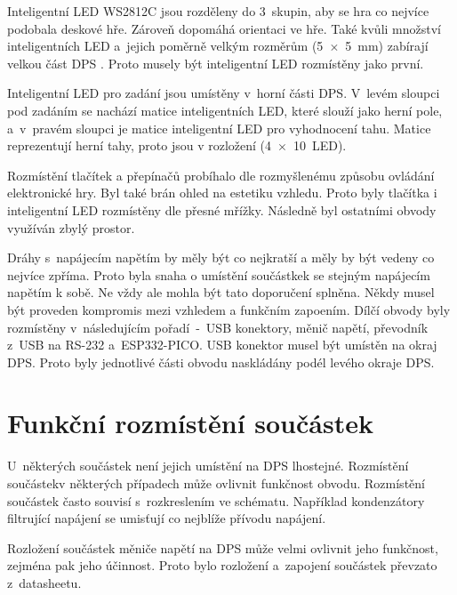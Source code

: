   Inteligentní LED WS2812C jsou rozděleny do 3~skupin, aby se hra co nejvíce podobala deskové hře. Zároveň dopomáhá orientaci ve hře.
  Také kvůli množství inteligentních LED a~jejich poměrně velkým rozměrům (5~$\times$~5~mm) zabírají velkou část DPS 
  \cite{WS2812C_datasheet}. Proto musely být inteligentní LED rozmístěny jako první.

  Inteligentní LED pro zadání jsou umístěny v~horní části DPS. V~levém sloupci pod zadáním se nachází matice inteligentních LED, které slouží jako herní 
  pole, a~v~pravém sloupci je matice inteligentní LED pro vyhodnocení tahu. Matice reprezentují herní tahy, proto jsou v rozložení (4~$\times$~10~LED).
  
  Rozmístění tlačítek a přepínačů probíhalo dle 
  rozmyšlenému způsobu ovládání elektronické hry. Byl také brán ohled na estetiku vzhledu. Proto byly tlačítka i inteligentní LED
  rozmístěny dle přesné mřížky. Následně byl ostatními obvody využíván zbylý prostor. 

  Dráhy s~napájecím napětím by měly být co nejkratší a měly by být vedeny co nejvíce zpříma. Proto byla snaha o umístění součástkek
  se stejným napájecím napětím k sobě. Ne vždy ale mohla být tato doporučení splněna. Někdy musel být proveden kompromis mezi vzhledem a funkčním 
  zapoením. 
  Dílčí obvody byly rozmístěny v~následujícím pořadí~-~USB konektory, měnič napětí, převodník z~USB 
  na RS-232 a~ESP332-PICO. USB konektor musel být umístěn na okraj DPS. Proto byly jednotlivé části obvodu naskládány podél levého okraje DPS.


  \section{Funkční rozmístění součástek}
  U~některých součástek není jejich umístění na DPS lhostejné. Rozmístění součástekv některých případech může ovlivnit funkčnost obvodu. 
  Rozmístění součástek často souvisí s~rozkreslením ve schématu. Například kondenzátory filtrující napájení se umisťují co nejblíže přívodu napájení.

  Rozložení součástek měniče napětí na DPS může velmi ovlivnit jeho funkčnost, zejména pak jeho účinnost. Proto bylo rozložení a~zapojení součástek 
  převzato z~datasheetu.

